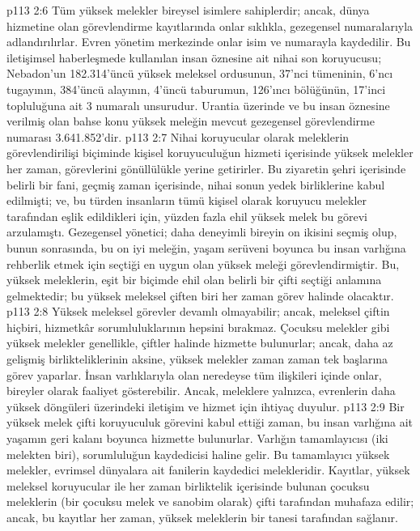 \vs p113 2:6 Tüm yüksek melekler bireysel isimlere sahiplerdir; ancak, dünya hizmetine olan görevlendirme kayıtlarında onlar sıklıkla, gezegensel numaralarıyla adlandırılırlar. Evren yönetim merkezinde onlar isim ve numarayla kaydedilir. Bu iletişimsel haberleşmede kullanılan insan öznesine ait nihai son koruyucusu; Nebadon’un 182.314’üncü yüksek meleksel ordusunun, 37’nci tümeninin, 6’ncı tugayının, 384’üncü alayının, 4’üncü taburumun, 126’ıncı bölüğünün, 17’inci topluluğuna ait 3 numaralı unsurudur. Urantia üzerinde ve bu insan öznesine verilmiş olan bahse konu yüksek meleğin mevcut gezegensel görevlendirme numarası 3.641.852’dir.
\vs p113 2:7 Nihai koruyucular olarak meleklerin görevlendirilişi biçiminde kişisel koruyuculuğun hizmeti içerisinde yüksek melekler her zaman, görevlerini gönüllülükle yerine getirirler. Bu ziyaretin şehri içerisinde belirli bir fani, geçmiş zaman içerisinde, nihai sonun yedek birliklerine kabul edilmişti; ve, bu türden insanların tümü kişisel olarak koruyucu melekler tarafından eşlik edildikleri için, yüzden fazla ehil yüksek melek bu görevi arzulamıştı. Gezegensel yönetici; daha deneyimli bireyin on ikisini seçmiş olup, bunun sonrasında, bu on iyi meleğin, yaşam serüveni boyunca bu insan varlığına rehberlik etmek için seçtiği en uygun olan yüksek meleği görevlendirmiştir. Bu, yüksek meleklerin, eşit bir biçimde ehil olan belirli bir çifti seçtiği anlamına gelmektedir; bu yüksek meleksel çiften biri her zaman görev halinde olacaktır.
\vs p113 2:8 Yüksek meleksel görevler devamlı olmayabilir; ancak, meleksel çiftin hiçbiri, hizmetkâr sorumluluklarının hepsini bırakmaz. Çocuksu melekler gibi yüksek melekler genellikle, çiftler halinde hizmette bulunurlar; ancak, daha az gelişmiş birlikteliklerinin aksine, yüksek melekler zaman zaman tek başlarına görev yaparlar. İnsan varlıklarıyla olan neredeyse tüm ilişkileri içinde onlar, bireyler olarak faaliyet gösterebilir. Ancak, meleklere yalnızca, evrenlerin daha yüksek döngüleri üzerindeki iletişim ve hizmet için ihtiyaç duyulur.
\vs p113 2:9 Bir yüksek melek çifti koruyuculuk görevini kabul ettiği zaman, bu insan varlığına ait yaşamın geri kalanı boyunca hizmette bulunurlar. Varlığın tamamlayıcısı (iki melekten biri), sorumluluğun kaydedicisi haline gelir. Bu tamamlayıcı yüksek melekler, evrimsel dünyalara ait fanilerin kaydedici melekleridir. Kayıtlar, yüksek meleksel koruyucular ile her zaman birliktelik içerisinde bulunan çocuksu meleklerin (bir çocuksu melek ve sanobim olarak) çifti tarafından muhafaza edilir; ancak, bu kayıtlar her zaman, yüksek meleklerin bir tanesi tarafından sağlanır.
